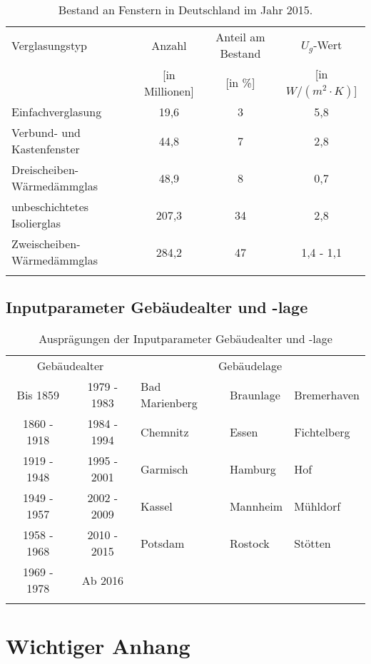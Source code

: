 \begin{table}[H]\centering
\begin{tabular}{lccc}
\toprule[1.5pt]
Verglasungstyp & Anzahl & Anteil am Bestand & \(U_g\)-Wert \\
 & [in Millionen] & [in \%] & [in \(W/(m^2 \cdot K)\)] \\ \addlinespace[5pt]
\midrule[2pt]
Einfachverglasung & 19,6 & 3 & 5,8 \\
\midrule
Verbund- und Kastenfenster & 44,8 & 7 & 2,8 \\
\midrule
Dreischeiben-Wärmedämmglas & 48,9 & 8 & 0,7 \\
\midrule
unbeschichtetes Isolierglas & 207,3 & 34 & 2,8 \\
\midrule
Zweischeiben-Wärmedämmglas & 284,2 & 47 & 1,4 - 1,1 \\
\bottomrule[1.5pt] \addlinespace[10pt]
\end{tabular}
\caption{Bestand an Fenstern in Deutschland im Jahr 2015. \cite{Bigalke.2016}}
\label{tab: TabelleA2}
\end{table}

\section{Inputparameter Gebäudealter und -lage}

\begin{table}[H]\centering
\begin{tabular}{cc|lll}
\toprule[1.5pt]
\multicolumn{2}{c}{Gebäudealter} & \multicolumn{3}{c}{Gebäudelage} \\ \addlinespace[5pt]
\midrule[2pt]
Bis 1859 & 1979 - 1983 & Bad Marienberg & Braunlage & Bremerhaven \\
\midrule
1860 - 1918 & 1984 - 1994 & Chemnitz & Essen & Fichtelberg \\
\midrule
1919 - 1948 & 1995 - 2001 & Garmisch & Hamburg & Hof \\
\midrule
1949 - 1957 & 2002 - 2009 & Kassel & Mannheim & Mühldorf \\
\midrule
1958 - 1968 & 2010 - 2015 & Potsdam & Rostock & Stötten \\
\midrule
1969 - 1978 & Ab 2016 &  &  & \\
\bottomrule[1.5pt] \addlinespace[10pt]
\end{tabular}
\caption{Ausprägungen der Inputparameter Gebäudealter und -lage}
\label{tab: TabelleA3}
\end{table}



\chapter{Wichtiger Anhang}
